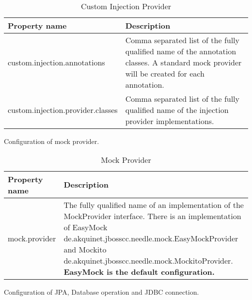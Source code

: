 \begin{table}[H]
\centering
\begin{tabular}{p{6cm}p{11cm}} \toprule
    \textbf{Property name} & \textbf{Description} \\ \midrule
    custom.injection.annotations & Comma separated list of the fully qualified name of the annotation classes. A standard mock provider will be created for each annotation. \\
    custom.injection.provider.classes & Comma separated list of the fully qualified name of the injection provider implementations. \\
\bottomrule
\end{tabular}
\caption{Custom Injection Provider}
\end{table}

\parskip 14pt
\parindent 0pt
Configuration of mock provider.

\begin{table}[H]
\centering
\begin{tabular}{p{6cm}p{11cm}} \toprule
    \textbf{Property name} & \textbf{Description} \\ \midrule
    mock.provider & The fully qualified name of an implementation of the MockProvider interface. There is an implementation of EasyMock de.akquinet.jbosscc.needle.mock.EasyMockProvider and Mockito de.akquinet.jbosscc.needle.mock.MockitoProvider. \textbf{EasyMock is the default configuration.}  \\
\bottomrule
\end{tabular}
\caption{Mock Provider}
\end{table}


\parskip 14pt
\parindent 0pt
Configuration of JPA, Database operation and JDBC connection.

